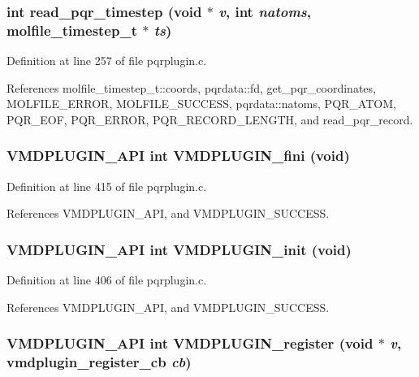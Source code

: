 \subsubsection{\setlength{\rightskip}{0pt plus 5cm}int read\_\-pqr\_\-timestep (void $\ast$ {\em v}, int {\em natoms}, {\bf molfile\_\-timestep\_\-t} $\ast$ {\em ts})\hspace{0.3cm}{\tt  [static]}}\label{pqrplugin_8c_a14}




Definition at line 257 of file pqrplugin.c.

References molfile\_\-timestep\_\-t::coords, pqrdata::fd, get\_\-pqr\_\-coordinates, MOLFILE\_\-ERROR, MOLFILE\_\-SUCCESS, pqrdata::natoms, PQR\_\-ATOM, PQR\_\-EOF, PQR\_\-ERROR, PQR\_\-RECORD\_\-LENGTH, and read\_\-pqr\_\-record.
\subsubsection{\setlength{\rightskip}{0pt plus 5cm}VMDPLUGIN\_\-API int VMDPLUGIN\_\-fini (void)}\label{pqrplugin_8c_a22}




Definition at line 415 of file pqrplugin.c.

References VMDPLUGIN\_\-API, and VMDPLUGIN\_\-SUCCESS.
\subsubsection{\setlength{\rightskip}{0pt plus 5cm}VMDPLUGIN\_\-API int VMDPLUGIN\_\-init (void)}\label{pqrplugin_8c_a20}




Definition at line 406 of file pqrplugin.c.

References VMDPLUGIN\_\-API, and VMDPLUGIN\_\-SUCCESS.
\subsubsection{\setlength{\rightskip}{0pt plus 5cm}VMDPLUGIN\_\-API int VMDPLUGIN\_\-register (void $\ast$ {\em v}, {\bf vmdplugin\_\-register\_\-cb} {\em cb})}\label{pqrplugin_8c_a21}




